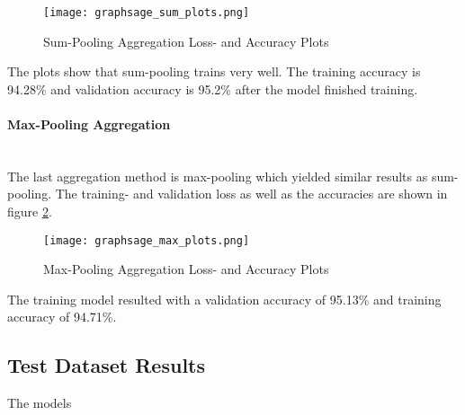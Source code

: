   \begin{figure}[h]
		\centering
		\texttt{[image: graphsage\_sum\_plots.png]}
		\caption{Sum-Pooling Aggregation Loss- and Accuracy Plots}
        \label{fig:sum_aggregation}
  \end{figure}

  \noindent The plots show that sum-pooling trains very well. The training 
  accuracy is 94.28\% and validation accuracy is 95.2\% after the model
  finished training.

  \paragraph{Max-Pooling Aggregation}  \mbox{}\\ 
  The last aggregation method is max-pooling which yielded similar results as
  sum-pooling. The training- and validation loss as well as the accuracies are 
  shown in figure \ref{fig:max_aggregation}. 

  \begin{figure}[h]
		\centering
		\texttt{[image: graphsage\_max\_plots.png]}
		\caption{Max-Pooling Aggregation Loss- and Accuracy Plots}
        \label{fig:max_aggregation}
  \end{figure}

  \noindent The training model resulted with a validation accuracy
  of 95.13\% and training accuracy of 94.71\%.

  \subsection{Test Dataset Results}
  
  The models 


